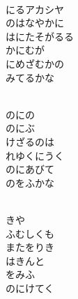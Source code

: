 \documentclass[10pt,b5j]{tarticle} %
\begin{document}
\vspace{1.5em} %
\newcommand{\linespace}{0.5em} %
\newcommand{\blocksize}{0.5\hsize} %
\newcommand{\itemmargin}{6em} %
\begin{enumerate} %
    \setlength{\itemindent}{\itemmargin} %
    \begin{minipage}[c]{\blocksize}
    
        \vspace{\linespace}
        \item~\\
        にるアカシヤ\\
        のはなやかに\\
        はにたそがるる\\
        かにむが\\
        にめざむかの\\
        みてるかな
        
        \vspace{\linespace}
        \item~\\
        のにの\\
        のにぶ\\
        けざるのは\\
        れゆくにうく\\
        のにあびて\\
        のをふかな
        
        \vspace{\linespace}
        \item~\\
        きや\\
        ふむしくも\\
        またをりき\\
        はきんと\\
        をみふ\\
        のにけてく
        

\end{minipage}
\end{enumerate}
\end{document}
